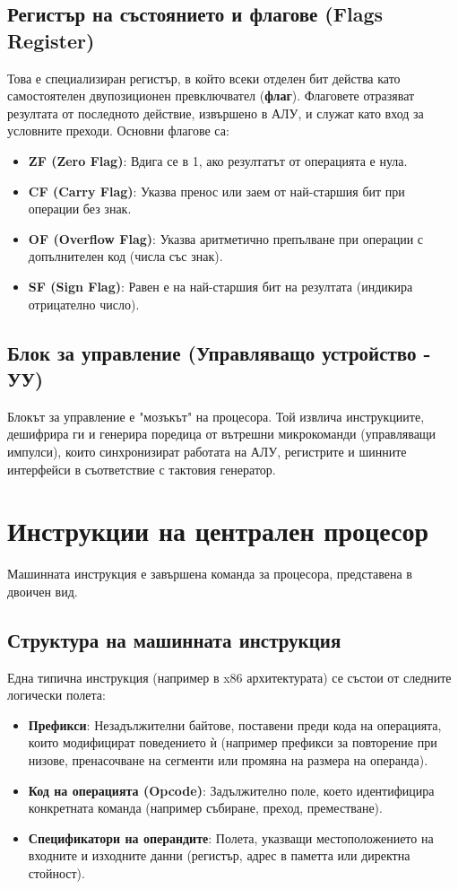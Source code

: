 \documentclass{scrartcl}
\begin{document}
\begin{FlushLeft}
\subsection{Регистър на състоянието и флагове (Flags Register)} 
Това е специализиран регистър, в който всеки отделен бит действа като самостоятелен двупозиционен превключвател (\textbf{флаг}). Флаговете отразяват резултата от последното действие, извършено в АЛУ, и служат като вход за условните преходи. Основни флагове са:
\begin{itemize}
    \item \textbf{ZF (Zero Flag)}: Вдига се в 1, ако резултатът от операцията е нула.
    \item \textbf{CF (Carry Flag)}: Указва пренос или заем от най-старшия бит при операции без знак.
    \item \textbf{OF (Overflow Flag)}: Указва аритметично препълване при операции с допълнителен код (числа със знак).
    \item \textbf{SF (Sign Flag)}: Равен е на най-старшия бит на резултата (индикира отрицателно число).
\end{itemize}

\subsection{Блок за управление (Управляващо устройство - УУ)} 
Блокът за управление е "мозъкът" на процесора. Той извлича инструкциите, дешифрира ги и генерира поредица от вътрешни микрокоманди (управляващи импулси), които синхронизират работата на АЛУ, регистрите и шинните интерфейси в съответствие с тактовия генератор.

\section{Инструкции на централен процесор} 

Машинната инструкция е завършена команда за процесора, представена в двоичен вид.

\subsection{Структура на машинната инструкция}
Една типична инструкция (например в x86 архитектурата) се състои от следните логически полета:
\begin{itemize}
    \item \textbf{Префикси}: Незадължителни байтове, поставени преди кода на операцията, които модифицират поведението ѝ (например префикси за повторение при низове, пренасочване на сегменти или промяна на размера на операнда).
    \item \textbf{Код на операцията (Opcode)}: Задължително поле, което идентифицира конкретната команда (например събиране, преход, преместване).
    \item \textbf{Спецификатори на операндите}: Полета, указващи местоположението на входните и изходните данни (регистър, адрес в паметта или директна стойност).
\end{itemize}


\end{FlushLeft}
\end{document}
